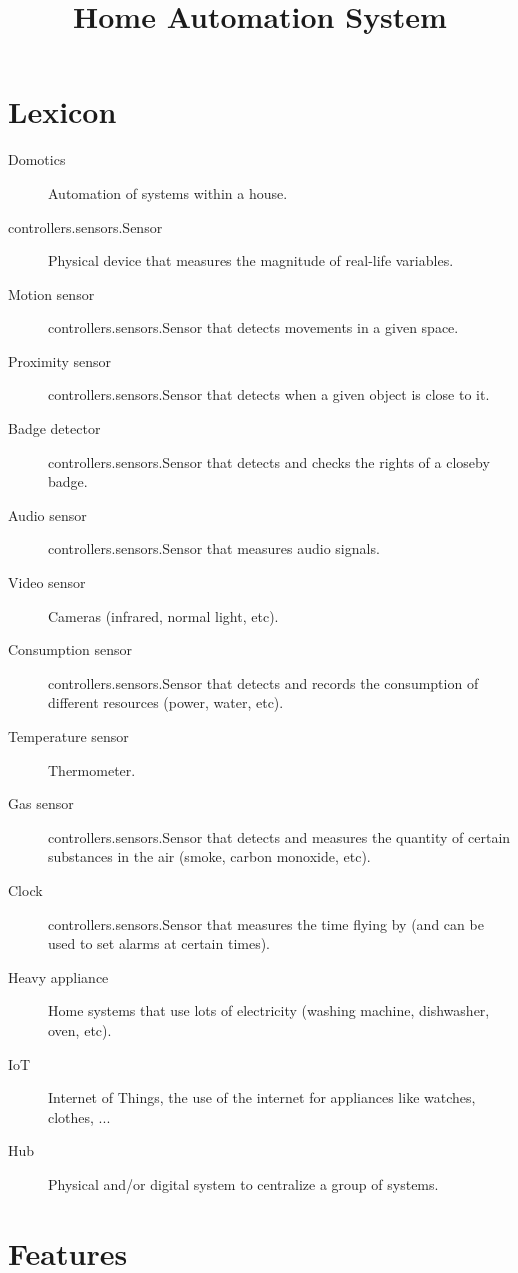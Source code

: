     \title{Home Automation System}
    \newpage

    \section{Lexicon}
        \begin{description}
            \item[Domotics] Automation of systems within a house.
            \item[controllers.sensors.Sensor] Physical device that measures the magnitude of real-life variables.
            \item[Motion sensor] controllers.sensors.Sensor that detects movements in a given space.
            \item[Proximity sensor] controllers.sensors.Sensor that detects when a given object is close to it.
            \item[Badge detector] controllers.sensors.Sensor that detects and checks the rights of a closeby badge.
            \item[Audio sensor] controllers.sensors.Sensor that measures audio signals.
            \item[Video sensor] Cameras (infrared, normal light, etc).
            \item[Consumption sensor] controllers.sensors.Sensor that detects and records the consumption of different resources (power, water, etc).
            \item[Temperature sensor] Thermometer.
            \item[Gas sensor] controllers.sensors.Sensor that detects and measures the quantity of certain substances in the air (smoke, carbon monoxide, etc).
            \item[Clock] controllers.sensors.Sensor that measures the time flying by (and can be used to set alarms at certain times).
            \item[Heavy appliance] Home systems that use lots of electricity (washing machine, dishwasher, oven, etc).
            \item[IoT] Internet of Things, the use of the internet for appliances like watches, clothes, ...
            \item[Hub] Physical and/or digital system to centralize a group of systems.
        \end{description}

    \section{Features}
